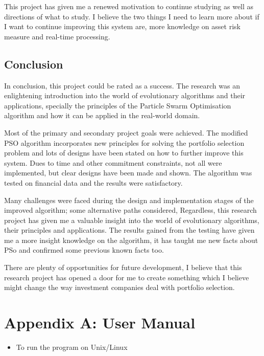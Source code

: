 \documentclass{pdfmx4020}
\begin{document}
  This project has given me a renewed motivation to continue studying as well as directions of what to study. I believe the two things I need to learn more about if I want to continue improving this system are, more knowledge on asset risk measure and real-time processing. 

  \section{Conclusion} %
  \label{sec:conclusion}
  In conclusion, this project could be rated as a success. The research was an enlightening introduction into the world of evolutionary algorithms and their applications, specially the principles of the Particle Swarm Optimisation algorithm and how it can be applied in the real-world domain.

  Most of the primary and secondary project goals were achieved. The modified PSO algorithm incorporates new principles for solving the portfolio selection problem and lots of designs have been stated on how to further improve this system. Dues to time and other commitment constraints, not all were implemented, but clear designs have been made and shown. The algorithm was tested on financial data and the results were satisfactory.

  Many challenges were faced during the design and implementation stages of the improved algorithm; some alternative paths considered, Regardless, this research project has given me a valuable insight into the world of evolutionary algorithms, their principles and applications. The results gained from the testing have given me a more insight knowledge on the algorithm, it has taught me new facts about PSo and confirmed some previous known facts too.

  There are plenty of opportunities for future development, I believe that this research project has opened a door for me to create something which I believe might change the way investment companies deal with portfolio selection.

  






\chapter*{Appendix A: User Manual}

\begin{itemize}
  \item To run the program on Unix/Linux
\end{itemize}
\end{document}
